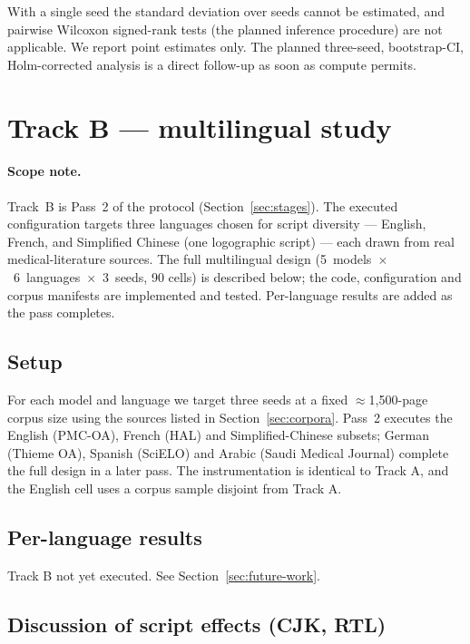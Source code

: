 \documentclass[10pt,a4paper]{article}
\begin{document}
With a single seed the standard deviation over seeds cannot be estimated,
and pairwise Wilcoxon signed-rank tests (the planned inference procedure)
are not applicable. We report point estimates only. The planned three-seed,
bootstrap-CI, Holm-corrected analysis is a direct follow-up as soon as
compute permits.

\section{Track B --- multilingual study}

\paragraph{Scope note.}
Track~B is Pass~2 of the protocol (Section~\ref{sec:stages}). The executed
configuration targets three languages chosen for script diversity --- English,
French, and Simplified Chinese (one logographic script) --- each drawn from
real medical-literature sources. The full multilingual design
(5~models~$\times$~6~languages~$\times$~3~seeds, 90 cells) is described below;
the code, configuration and corpus manifests are implemented and tested.
Per-language results are added as the pass completes.

\subsection{Setup}

For each model and language we target three seeds at a fixed
$\approx$1{,}500-page corpus size using the sources listed in
Section~\ref{sec:corpora}. Pass~2 executes the English (PMC-OA), French
(HAL) and Simplified-Chinese subsets; German (Thieme OA), Spanish (SciELO)
and Arabic (Saudi Medical Journal) complete the full design in a later pass.
The instrumentation is identical to Track A, and the English cell uses a
corpus sample disjoint from Track A.

\subsection{Per-language results}

Track B not yet executed. See Section~\ref{sec:future-work}.

\subsection{Discussion of script effects (CJK, RTL)}
\end{document}
